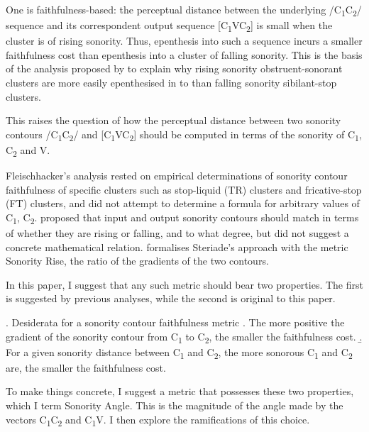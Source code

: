\documentclass[12pt]{article}
\begin{document}
One is faithfulness-based: the perceptual distance between the underlying /C\textsubscript{1}C\textsubscript{2}/ sequence and its correspondent
output sequence [C\textsubscript{1}VC\textsubscript{2}] is small when the cluster is of rising sonority.
Thus, epenthesis into such a sequence incurs a smaller faithfulness cost than epenthesis into a cluster of falling sonority. This is the basis of the analysis proposed by \cite{fleischhacker.2002, fleischhacker.2005} to explain why rising sonority obstruent-sonorant clusters are more easily epenthesised in
to than falling sonority sibilant-stop clusters.

This raises the question of how the perceptual distance between two sonority contours /C\textsubscript{1}C\textsubscript{2}/ and [C\textsubscript{1}VC\textsubscript{2}] should be computed in terms of the sonority of C\textsubscript{1}, C\textsubscript{2} and V.  

Fleischhacker's analysis rested on empirical determinations of sonority contour faithfulness of specific clusters such as stop-liquid (TR) clusters and fricative-stop (FT) clusters, and did not attempt to determine a formula for arbitrary values of C\textsubscript{1}, C\textsubscript{2}. \citet{steriade.2006} proposed that input and output sonority contours should match in terms of whether they are rising or falling, and to what degree, but did not suggest a concrete mathematical relation.  \citet{flemming.2008} formalises Steriade's approach with the metric {\sc Sonority Rise}, the ratio of the gradients of the two contours.

\bigskip

In this paper, I suggest that any such metric should bear two properties. The first is suggested by previous analyses, while the second is original to this paper.

\ex. Desiderata for a sonority contour faithfulness metric \label{desiderata}
     \a. The more positive the gradient of the sonority contour from C\textsubscript{1} to C\textsubscript{2}, the smaller the faithfulness cost. \label{desideratum_a}
     \b. For a given sonority distance between C\textsubscript{1} and C\textsubscript{2}, the more sonorous C\textsubscript{1} and C\textsubscript{2} are, the smaller the faithfulness cost. \label{desideratum_b}

To make things concrete, I suggest a metric that possesses these two properties, which I term {\sc Sonority Angle}. This is the magnitude of the angle made by the vectors C\textsubscript{1}C\textsubscript{2} and C\textsubscript{1}V. I then explore the ramifications of this choice. 
\end{document}
